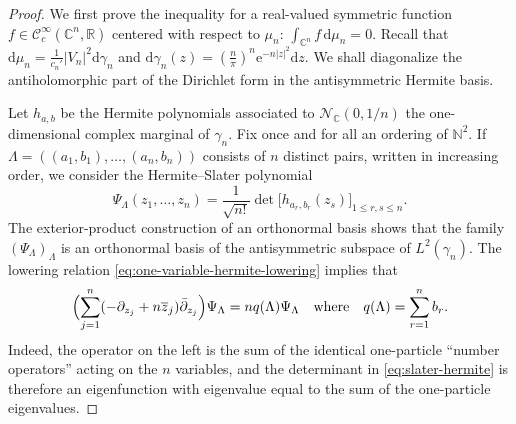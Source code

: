 \documentclass[11pt,reqno]{amsart}
\numberwithin{equation}{section}%
\numberwithin{figure}{section}%
\numberwithin{table}{section}
\theoremstyle{plain}
\theoremstyle{definition}
\begin{document}
\begin{proof}
  We first prove the inequality for a real-valued symmetric function
  $f\in\mathcal{C}_c^\infty(\mathbb{C}^n,\mathbb{R})$ centered with respect to
  $\mu_n$: $\int_{\mathbb{C}^n}f\,\mathrm{d}\mu_n=0$. Recall that
  $\mathrm{d}\mu_n=\frac{1}{c_n'}|V_n|^2\mathrm{d}\gamma_n$ and
  $\mathrm{d}\gamma_n(z)=(\frac{n}{\pi})^n\mathrm{e}^{-n|z|^2}\mathrm{d}z$. We
  shall diagonalize the antiholomorphic part of the Dirichlet form in the
  antisymmetric Hermite basis.

  Let $h_{a,b}$ be the Hermite polynomials associated to
  $\mathcal{N}_{\mathbb{C}}(0,1/n)$ the one-dimensional complex marginal of
  $\gamma_n$. Fix once and for all an ordering of $\mathbb{N}^2$. If
  $\Lambda=((a_1,b_1),\ldots,(a_n,b_n))$ consists of $n$ distinct pairs,
  written in increasing order, we consider the Hermite--Slater polynomial
  \begin{equation}\label{eq:slater-hermite}
    \Psi_\Lambda(z_1,\ldots,z_n)
    =
    \frac{1}{\sqrt{n!}}
    \det\bigl[h_{a_r,b_r}(z_s)\bigr]_{1\leq r,s\leq n}.
  \end{equation}
  The exterior-product construction of an orthonormal basis shows that the
  family ${( \Psi_\Lambda )}_\Lambda$ is an orthonormal basis of the
  antisymmetric subspace of $L^2(\gamma_n)$. The lowering relation
  \eqref{eq:one-variable-hermite-lowering} implies that
  \begin{equation}\label{eq:slater-number-operator}
    \Bigl(\sum_{j=1}^n(-\partial_{z_j}+n\overline z_j)\bar\partial_{z_j}\Bigr)\Psi_\Lambda
    = nq(\Lambda)\Psi_\Lambda
    \quad\text{where}\quad
    q(\Lambda) = \sum_{r=1}^n b_r.
  \end{equation}
  Indeed, the operator on the left is the sum of the identical one-particle
  ``number operators'' acting on the $n$ variables, and the determinant in
  \eqref{eq:slater-hermite} is therefore an eigenfunction with eigenvalue
  equal to the sum of the one-particle eigenvalues.


\end{proof}
\end{document}
